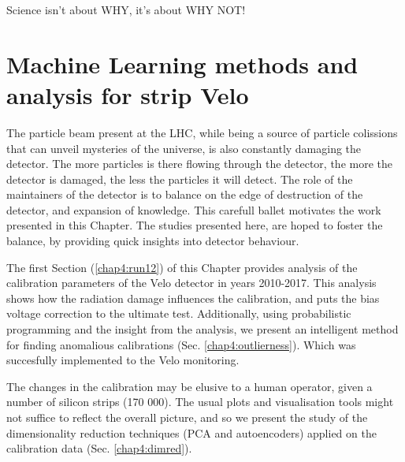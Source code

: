 \begin{savequote}[75mm]
Science isn't about WHY, it's about WHY NOT!
\end{savequote}
\chapter{Machine Learning methods and analysis for strip Velo}
\label{chap:ml-velo}


The particle beam present at the LHC, while being a source of particle colissions that can unveil mysteries of the universe, is also constantly damaging the detector.
The more particles is there flowing through the detector, the more the detector is damaged, the less the particles it will detect.
The role of the maintainers of the detector is to balance on the edge of destruction of the detector, and expansion of knowledge.
This carefull ballet motivates the work presented in this Chapter.
The studies presented here, are hoped to foster the balance, by providing quick insights into detector behaviour.

The first Section (\ref{chap4:run12}) of this Chapter provides analysis of the calibration parameters of the Velo detector in years 2010-2017. This analysis shows how the radiation damage influences the calibration, and puts the bias voltage correction to the ultimate test. 
Additionally, using probabilistic programming and the insight from the analysis, we present an intelligent method for finding anomalious calibrations (Sec. \ref{chap4:outlierness}). Which was succesfully implemented to the Velo monitoring.

The changes in the calibration may be elusive to a human operator, given a number of silicon strips (170 000).
The usual plots and visualisation tools might not suffice to reflect the overall picture, and so we present the study of the dimensionality reduction techniques (PCA and autoencoders) applied on the calibration data (Sec. \ref{chap4:dimred}). 

